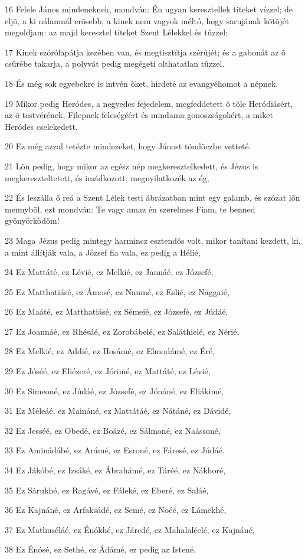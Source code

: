 \par 16 Felele János mindeneknek, mondván: Én ugyan keresztellek titeket vízzel; de eljõ, a ki nálamnál erõsebb, a kinek nem vagyok méltó, hogy sarujának kötõjét megoldjam: az majd keresztel titeket Szent Lélekkel  és tûzzel:
\par 17 Kinek szórólapátja kezében van, és megtisztítja szérûjét; és a gabonát az õ csûrébe takarja, a polyvát pedig megégeti olthatatlan tûzzel.
\par 18 És még sok egyebekre is intvén õket, hirdeté az evangyéliomot a népnek.
\par 19 Mikor pedig Heródes, a negyedes fejedelem, megfeddetett õ tõle Heródiásért, az õ testvérének, Filepnek feleségéért és mindama gonoszságokért, a miket Heródes cselekedett,
\par 20 Ez még azzal tetézte mindezeket, hogy Jánost tömlöczbe vetteté.
\par 21 Lõn pedig, hogy mikor az egész nép megkeresztelkedett, és Jézus is megkereszteltetett, és imádkozott, megnyilatkozék az ég,
\par 22 És leszálla õ reá a Szent Lélek testi ábrázatban mint egy galamb, és szózat lõn mennybõl, ezt mondván: Te vagy amaz én szerelmes Fiam,  te benned gyönyörködöm!
\par 23 Maga Jézus pedig mintegy harmincz esztendõs volt, mikor tanítani kezdett, ki, a mint állítják vala, a József fia vala, ez pedig a Hélié,
\par 24 Ez Mattáté, ez Lévié, ez Melkié, ez Jannáé, ez Józsefé,
\par 25 Ez Matthatiásé, ez Ámosé, ez Naumé, ez Eslié, ez Naggaié,
\par 26 Ez Maáté, ez Matthatiásé, ez Sémeié, ez Józsefé, ez Júdáé,
\par 27 Ez Joannáé, ez Rhésáé, ez Zorobábelé, ez Saláthielé, ez Nérié,
\par 28 Ez Melkié, ez Addié, ez Hosámé, ez Elmodámé, ez Éré,
\par 29 Ez Jóséé, ez Eliézeré, ez Jórimé, ez Mattáté, ez Lévié,
\par 30 Ez Simeoné, ez Júdáé, ez Józsefé, ez Jónáné, ez Eliákimé,
\par 31 Ez Méleáé, ez Maináné, ez Mattátáé, ez Nátáné, ez Dávidé,
\par 32 Ez Jesséé, ez Obedé, ez Boázé, ez Sálmoné, ez Naássoné,
\par 33 Ez Aminádábé, ez Arámé, ez Esroné, ez Fáresé, ez  Júdáé.
\par 34 Ez Jákóbé, ez Izsáké, ez Ábrahámé, ez Táréé, ez Nákhoré,
\par 35 Ez Sárukhé, ez Ragávé, ez Fáleké, ez Eberé, ez Saláé,
\par 36 Ez Kajnáné, ez Arfaksádé, ez Semé, ez Noéé, ez Lámekhé,
\par 37 Ez Mathuséláé, ez Énókhé, ez Járedé, ez Mahalaléelé, ez Kajnáné,
\par 38 Ez Énósé, ez Sethé, ez  Ádámé, ez pedig az Istené.


